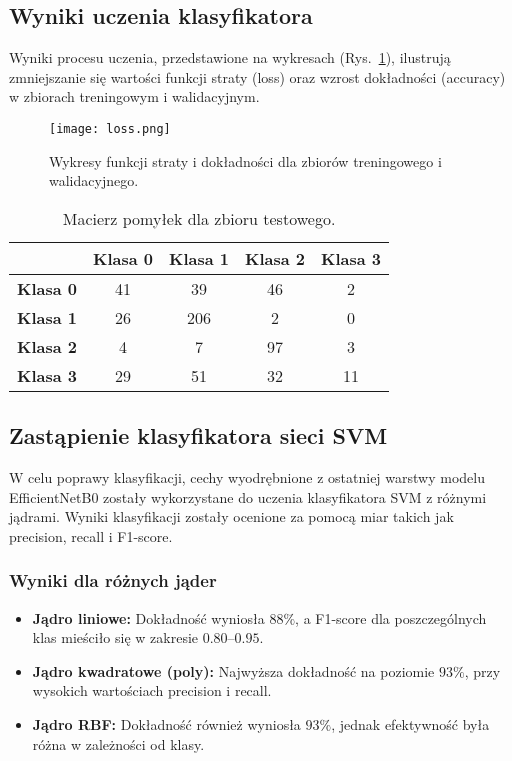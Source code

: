 \subsection{Wyniki uczenia klasyfikatora}
Wyniki procesu uczenia, przedstawione na wykresach (Rys.~\ref{fig:loss_accuracy}), ilustrują zmniejszanie się wartości funkcji straty (loss) oraz wzrost dokładności (accuracy) w zbiorach treningowym i walidacyjnym.

\begin{figure}[h!]
    \centering
    \texttt{[image: loss.png]}
    \caption{Wykresy funkcji straty i dokładności dla zbiorów treningowego i walidacyjnego.}
    \label{fig:loss_accuracy}
\end{figure}

\begin{table}[h!]
\centering
\begin{tabular}{|c|c|c|c|c|}
\hline
\textbf{} & \textbf{Klasa 0} & \textbf{Klasa 1} & \textbf{Klasa 2} & \textbf{Klasa 3} \\ \hline
\textbf{Klasa 0} & 41 & 39 & 46 & 2 \\ \hline
\textbf{Klasa 1} & 26 & 206 & 2 & 0 \\ \hline
\textbf{Klasa 2} & 4 & 7 & 97 & 3 \\ \hline
\textbf{Klasa 3} & 29 & 51 & 32 & 11 \\ \hline
\end{tabular}
\caption{Macierz pomyłek dla zbioru testowego.}
\label{tab:confusion_matrix_last_layer}
\end{table}

\subsection{Zastąpienie klasyfikatora sieci SVM}
W celu poprawy klasyfikacji, cechy wyodrębnione z ostatniej warstwy modelu EfficientNetB0 zostały wykorzystane do uczenia klasyfikatora SVM z różnymi jądrami. Wyniki klasyfikacji zostały ocenione za pomocą miar takich jak precision, recall i F1-score.

\subsubsection{Wyniki dla różnych jąder}
\begin{itemize}
    \item \textbf{Jądro liniowe:} Dokładność wyniosła $88\%$, a F1-score dla poszczególnych klas mieściło się w zakresie $0.80$--$0.95$. 
    \item \textbf{Jądro kwadratowe (poly):} Najwyższa dokładność na poziomie $93\%$, przy wysokich wartościach precision i recall.
    \item \textbf{Jądro RBF:} Dokładność również wyniosła $93\%$, jednak efektywność była różna w zależności od klasy.
\end{itemize}

